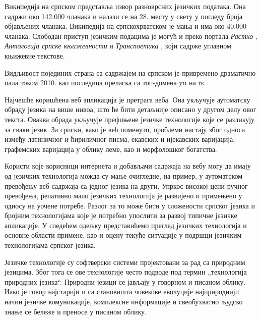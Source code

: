 {\begin{multicols}{2}
Википедија на српском представља извор разноврсних језичких података. Она садржи око 142.000 чланака и налази се на  28. месту \cite{WIKI} у свету у погледу броја објављених чланака. Википедија на српскохрватском \cite{SHWIKI}   је мања и  има око 40.000 чланака. Слободан приступ језичким подацима је могућ и преко портала \textit{Растко} \cite{RASTKO},  \textit{Антологија српске књижевности} \cite{ASK} и \textit{Транспоетика} \cite{TRPOET}, који садрже углавном књижевне текстове.
 
Видљивост појединих страна са садржајем на српском је привремено драматично пала током 2010. као последица преласка са топ-домена yu на rs. 

Најчешће коришћена веб апликација је претрага веба. Она укључује аутоматску обраду језика на више нивоа, што ће бити детаљније описано у другом делу овог текста.  Оваква обрада укључује префињене језичке технологије које се разликују за сваки језик.  За српски, како је већ поменуто,  проблеми настају због односа између латиничног и ћириличног писма,  екавских и ијекавских варијација, графемских варијација у облику леме, као и морфолошког богатства. 

Користи које корисници интернета и добављачи садржаја на вебу могу да имају од језичких технологија можда су мање очигледне, на пример, у аутоматском превођењу веб садржаја са једног језика на други. Упркос високој цени ручног превођења, релативно мало језичких технологија је развијено и примењено у односу на уочене потребе.  Разлог за то може бити у сложености српског језика и бројним технологијама које је потребно упослити за развој типичне језичке апликације. У следећем одељку представићемо преглед језичких технологија и основне области примене,  као и оцену текуће ситуације у подршци језичким технологијама српског језика.
\end{multicols}

\clearpage

\begin{multicols}{2}   


Језичке технологије су софтверски системи пројектовани за рад са природним језицима. Због тога се ове технологије често подводе под термин „технологија природних језика“. Природни језици се јављају у говорном и писаном облику. Иако је говор најстарији и са становишта човекове еволуције најприроднији начин језичке комуникације, комплексне информације и свеобухватно људско знање се бележе и преносе у писаном облику. 


\end{multicols}}
